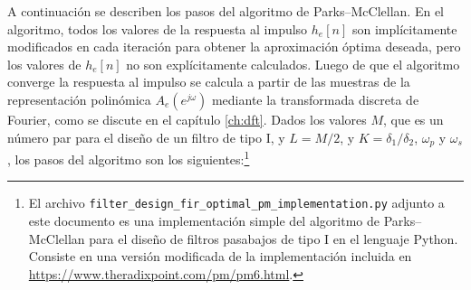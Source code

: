 \documentclass[a4paper]{report}
\begin{document}
A continuación se describen los pasos del algoritmo de Parks--McClellan. En el algoritmo, todos los valores de la respuesta al impulso \(h_e[n]\) son implícitamente modificados en cada iteración para obtener la aproximación óptima deseada, pero los valores de \(h_e[n]\) no son explícitamente calculados. Luego de que el algoritmo converge la respuesta al impulso se calcula a partir de las muestras de la representación polinómica \(A_e(e^{j\omega})\) mediante la transformada discreta de Fourier, como se discute en el capítulo \ref{ch:dft}. Dados los valores \(M\), que es un número par para el diseño de un filtro de tipo I, y \(L=M/2\), y \(K=\delta_1/\delta_2\), \(\omega_p\) y \(\omega_s\), los pasos del algoritmo son los siguientes:\footnote{El archivo \texttt{filter\_design\_fir\_optimal\_pm\_implementation.py} adjunto a este documento es una implementación simple del algoritmo de Parks--McClellan para el diseño de filtros pasabajos de tipo I en el lenguaje Python. Consiste en una versión modificada de la implementación incluida en \url{https://www.theradixpoint.com/pm/pm6.html}.}
\end{document}
